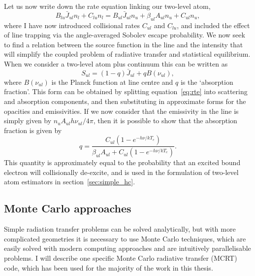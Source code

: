 Let us now write down the rate equation linking our two-level atom,
\begin{equation}
B_{lu} \bar{J}_{ul} n_l + C_{lu} n_l = 
B_{ul} \bar{J}_{ul} n_u + \beta_{ul} A_{ul} n_u + C_{ul} n_u,
\label{eq:rate_2level}
\end{equation}
where I have now introduced collisional rates $C_{ul}$ and $C_{lu}$, and included
the effect of line trapping via the angle-averaged Sobolev escape probability.
We now seek to find a relation between the source function in the line
and the intensity that will simplify the coupled problem of radiative transfer
and statistical equilibrium. When we consider a two-level atom
plus continuum this can be written as \citep{mihalas}
\begin{equation}
S_{ul} = (1 - q) \bar{J}_{ul} + q B(\nu_{ul}),
\label{eq:rate_2level}
\end{equation}
where $B(\nu_{ul})$ is the Planck function at line centre and $q$ is the 
`absorption fraction'. This form can be obtained by splitting
equation~\ref{eq:rte} into scattering and absorption components, and then
substituting in approximate forms for the opacities and emissivities.
If we now consider that the emissivity in the line is simply give\cal n
by $n_u A_{ul} h \nu_{ul} / 4 \pi$, then it is possible to show that
the absorption fraction is given by
\begin{equation}
q = \frac{C_{ul} (1 - e^{-h\nu/kT_e})}{\beta_{ul} A_{ul} + C_{ul} (1 - e^{-h\nu/kT_e})}.
\end{equation}
This quantity is approximately equal to
the probability that an excited bound electron
will collisionally de-excite, and is used in the formulation of two-level atom
estimators in section~\ref{sec:simple_hc}.



\subsection{Monte Carlo approaches}

Simple radiation transfer problems can be solved analytically,
but with more complicated geometries it is necessary to use Monte Carlo
techniques, which are easily solved with modern computing approaches and 
are intuitively parallelisable problems. I will describe one specific 
Monte Carlo radiative transfer (MCRT) code, which has been used
for the majority of the work in this thesis.









